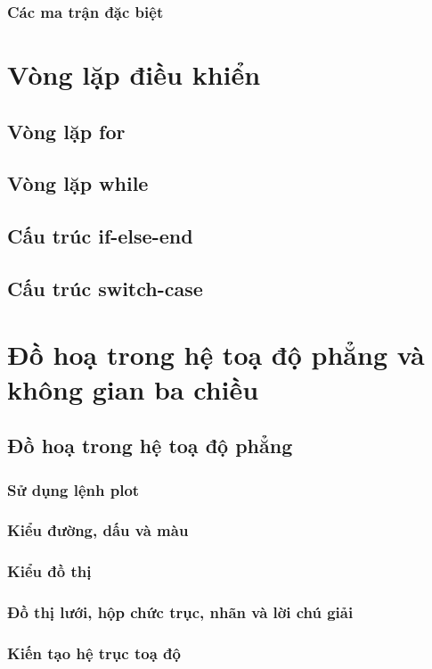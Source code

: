 \documentclass[12pt,a4paper]{article}
\begin{document}
\subsubsection{Các ma trận đặc biệt}
\section{Vòng lặp điều khiển}
\subsection{Vòng lặp for}
\subsection{Vòng lặp while}
\subsection{Cấu trúc if-else-end}
\subsection{Cấu trúc switch-case}
\section{Đồ hoạ trong hệ toạ độ phẳng và không gian ba chiều}
\subsection{Đồ hoạ trong hệ toạ độ phẳng}
\subsubsection{Sử dụng lệnh plot}
\subsubsection{Kiểu đường, dấu và màu}
\subsubsection{Kiểu đồ thị}
\subsubsection{Đồ thị lưới, hộp chức trục, nhãn và lời chú giải}
\subsubsection{Kiến tạo hệ trục toạ độ}
\end{document}
